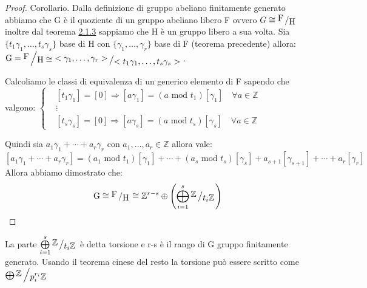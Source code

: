 \documentclass[11pt, a4paper, twoside]{article}
\newcommand{\bigslant}[2]{{\raisebox{.2em}{$#1$}\left/\raisebox{-.2em}{$#2$}\right.}}
\begin{document}
\newpage

\begin{proof}{Corollario.}
	Dalla definizione di gruppo abeliano finitamente generato abbiamo che G è il quoziente di un gruppo abeliano libero F ovvero $G\cong \bigslant{\text{F}}{\text{H}}$ inoltre dal teorema \hyperref[sottogruppi]{2.1.3} sappiamo che H è un gruppo libero a sua volta. Sia $\{t_1\gamma_1,\dots,t_s\gamma_s\}$ base di H con $\{\gamma_1,\dots,\gamma_r\}$ base di F (teorema precedente) allora: $\text{G}=\bigslant{\text{F}}{\text{H}\cong \bigslant{<\gamma_1,\dots,\gamma_r>}{<t_1\gamma_1,\dots,t_s\gamma_s>}}$. 

	Calcoliamo le classi di equivalenza di un generico elemento di F sapendo che valgono:
	$\begin{cases}
		&[t_1\gamma_1]=[0]\Rightarrow [a\gamma_1]=(a \text{ mod } t_1)[\gamma_1] \quad \forall a\in \mathbb{Z}\\ 
		&\vdots\\
		&[t_s\gamma_s]=[0]\Rightarrow [a\gamma_s]=(a  \text{ mod } t_s)[\gamma_s] \quad \forall a\in \mathbb{Z}
	\end{cases}$
	
	Quindi sia $a_1\gamma_1+\cdots+a_r\gamma_r$ con $a_1,\dots,a_r\in\mathbb{Z}$ allora vale:
	\[
		[a_1\gamma_1+\cdots+a_r\gamma_r]=(a_1  \text{ mod } t_1)[\gamma_1]+\cdots+(a_s  \text{ mod } t_s)[\gamma_s] +a_{s+1}[\gamma_{s+1}]+\cdots+a_r[\gamma_r] 
	\]
	Allora abbiamo dimostrato che:
	\[
		\text{G}\cong\bigslant{\text{F}}{\text{H}}\cong \mathbb{Z}^{r-s} \oplus \left(\bigoplus\limits_{i=1}^s\bigslant{\mathbb{Z}}{t_i\mathbb{Z}}\right)
	\]
\end{proof}

\begin{oss}
	La parte $\bigoplus\limits_{i=1}^s\bigslant{\mathbb{Z}}{t_i\mathbb{Z}}$ è detta torsione e r-s è il rango di G gruppo finitamente generato. Usando il teorema cinese del resto la torsione può essere scritto come $\bigoplus\bigslant{\mathbb{Z}}{p_i^{r_i}\mathbb{Z}}$ 
\end{oss}
\end{document}
